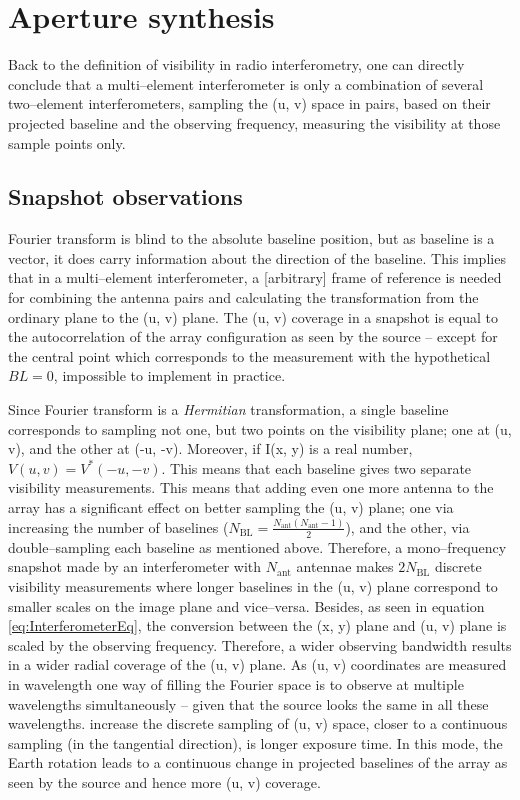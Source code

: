 \documentclass[a4wide,12pt]{book}
\begin{document}
{\section{Aperture synthesis}
Back to the definition of visibility in radio interferometry, one can directly conclude that a multi--element interferometer is only a combination of several two--element interferometers, sampling the (u, v) space in pairs, based on their projected baseline and the observing frequency, measuring the visibility at those sample points only. 

\subsection*{Snapshot observations}
Fourier transform is blind to the absolute baseline position, but as baseline is a vector, it does carry information about the direction of the baseline. This implies that in a multi--element interferometer, a [arbitrary] frame of reference is needed for combining the antenna pairs and calculating the transformation from the ordinary plane to the (u, v) plane. The (u, v) coverage in a snapshot is equal to the autocorrelation of the array configuration as seen by the source -- except for the central point which corresponds to the measurement with the hypothetical $BL = 0$, impossible to implement in practice.

Since Fourier transform is a \emph{Hermitian} transformation, a single baseline corresponds to sampling not one, but two points on the visibility plane; one at (u, v), and the other at (-u, -v). Moreover, if I(x, y) is a real number, $V(u, v) = V^*(-u, -v)$. This means that each baseline gives two separate visibility measurements. This means that adding even one more antenna to the array has a significant effect on better sampling the (u, v) plane; one via increasing the number of baselines ($N_\mathrm{BL} = \frac{N_\mathrm{ant}(N_\mathrm{ant}-1)}{2}$), and the other, via double--sampling each baseline as mentioned above. Therefore, a mono--frequency snapshot made by an interferometer with $N_\mathrm{ant}$ antennae makes $2N_\mathrm{BL}$ discrete visibility measurements where longer baselines in the (u, v) plane correspond to smaller scales on the image plane and vice--versa. Besides, as seen in equation \ref{eq:InterferometerEq}, the conversion between the (x, y) plane and (u, v) plane is scaled by the observing frequency. Therefore, a wider observing bandwidth results in a wider radial coverage of the (u, v) plane. As (u, v) coordinates are measured in wavelength one way of filling the Fourier space is to observe at multiple wavelengths simultaneously -- given that the source looks the same in all these wavelengths. increase the discrete sampling of (u, v) space, closer to a continuous sampling (in the tangential direction), is longer exposure time. In this mode, the Earth rotation leads to a continuous change in projected baselines of the array as seen by the source and hence more (u, v) coverage.

}
\end{document}
